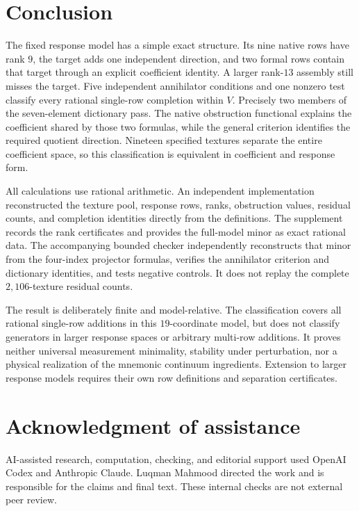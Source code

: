 \documentclass[12pt]{article}
\theoremstyle{definition}
\theoremstyle{remark}
\begin{document}
\section{Conclusion}\label{sec:limits}

The fixed response model has a simple exact structure.  Its nine native rows
have rank $9$, the target adds one independent direction, and two formal rows
contain that target through an explicit coefficient identity.  A larger
rank-$13$ assembly still misses the target.  Five independent annihilator
conditions and one nonzero test classify every rational single-row completion
within $V$.  Precisely two members of the seven-element dictionary pass.
The native obstruction functional explains the coefficient shared by those
two formulas, while the general criterion identifies the required quotient
direction.  Nineteen specified textures separate the entire coefficient
space, so this classification is equivalent in coefficient and response form.

All calculations use rational arithmetic.  An independent implementation
reconstructed the texture pool, response rows, ranks, obstruction values,
residual counts, and completion identities directly from the definitions.
The supplement records the rank certificates and provides the full-model
minor as exact rational data.  The accompanying bounded checker independently
reconstructs that minor from the four-index projector formulas, verifies the
annihilator criterion and dictionary identities, and tests negative controls.
It does not replay the complete $2{,}106$-texture residual counts.

The result is deliberately finite and model-relative.  The classification
covers all rational single-row additions in this $19$-coordinate model, but
does not classify generators in larger response spaces or arbitrary
multi-row additions.  It proves neither universal measurement minimality,
stability under perturbation, nor a physical realization of the mnemonic
continuum ingredients.  Extension to larger response models requires their
own row definitions and separation certificates.

\appendix


\section*{Acknowledgment of assistance}
AI-assisted research, computation, checking, and editorial support used
OpenAI Codex and Anthropic Claude. Luqman Mahmood directed the work
and is responsible for the claims and final text. These internal
checks are not external peer review.



\end{document}
